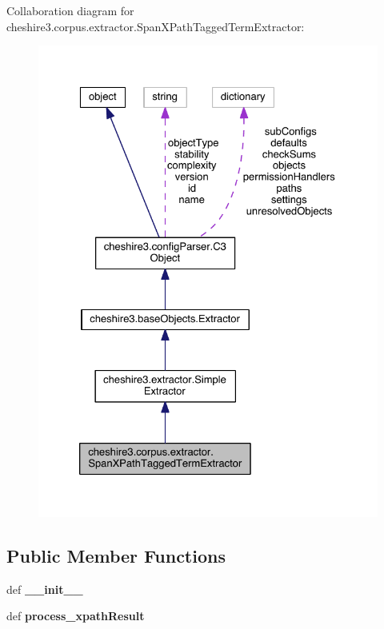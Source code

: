 Collaboration diagram for cheshire3.\-corpus.\-extractor.\-Span\-X\-Path\-Tagged\-Term\-Extractor\-:
\nopagebreak
\begin{figure}[H]
\begin{center}
\leavevmode
\includegraphics[width=326pt]{classcheshire3_1_1corpus_1_1extractor_1_1_span_x_path_tagged_term_extractor__coll__graph}
\end{center}
\end{figure}
\subsection*{Public Member Functions}
\begin{DoxyCompactItemize}
\item 
\hypertarget{classcheshire3_1_1corpus_1_1extractor_1_1_span_x_path_tagged_term_extractor_a5ed16b7167fc6d6e48bd43243473f611}{def {\bfseries \-\_\-\-\_\-init\-\_\-\-\_\-}}\label{classcheshire3_1_1corpus_1_1extractor_1_1_span_x_path_tagged_term_extractor_a5ed16b7167fc6d6e48bd43243473f611}

\item 
\hypertarget{classcheshire3_1_1corpus_1_1extractor_1_1_span_x_path_tagged_term_extractor_a7be7a07a4847a253873fbb3211889095}{def {\bfseries process\-\_\-xpath\-Result}}\label{classcheshire3_1_1corpus_1_1extractor_1_1_span_x_path_tagged_term_extractor_a7be7a07a4847a253873fbb3211889095}

\end{DoxyCompactItemize}
